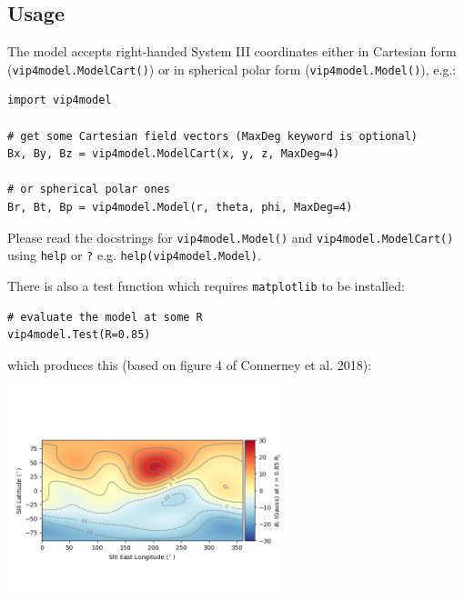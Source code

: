 \subsection{Usage}

The model accepts right-handed System III coordinates either in Cartesian form (\texttt{vip4model.ModelCart()}) or in spherical polar form (\texttt{vip4model.Model()}), e.g.:

\begin{verbatim}
import vip4model

# get some Cartesian field vectors (MaxDeg keyword is optional)
Bx, By, Bz = vip4model.ModelCart(x, y, z, MaxDeg=4)

# or spherical polar ones
Br, Bt, Bp = vip4model.Model(r, theta, phi, MaxDeg=4)
\end{verbatim}

Please read the docstrings for \texttt{vip4model.Model()} and \texttt{vip4model.ModelCart()} using \texttt{help} or \texttt{?} e.g. \texttt{help(vip4model.Model)}.

There is also a test function which requires \texttt{matplotlib} to be installed:

\begin{verbatim}
# evaluate the model at some R
vip4model.Test(R=0.85)
\end{verbatim}

which produces this (based on figure 4 of Connerney et al. 2018):

\begin{center}
\includegraphics[width=0.6\textwidth]{figures/ch3_vip4test.png}
\end{center}